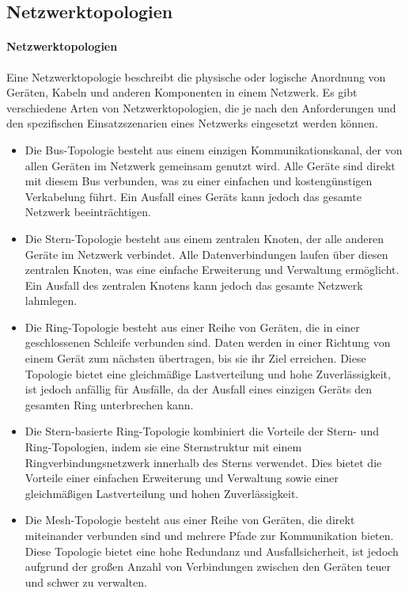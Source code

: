 \subsection{Netzwerktopologien}

\paragraph{Netzwerktopologien}

Eine Netzwerktopologie beschreibt die physische oder logische Anordnung von Geräten, Kabeln und anderen Komponenten in einem Netzwerk. Es gibt verschiedene Arten von Netzwerktopologien, die je nach den Anforderungen und den spezifischen Einsatzszenarien eines Netzwerks eingesetzt werden können.

\begin{itemize}
	\item Die Bus-Topologie besteht aus einem einzigen Kommunikationskanal, der von allen Geräten im Netzwerk gemeinsam genutzt wird. Alle Geräte sind direkt mit diesem Bus verbunden, was zu einer einfachen und kostengünstigen Verkabelung führt. Ein Ausfall eines Geräts kann jedoch das gesamte Netzwerk beeinträchtigen.
	\item Die Stern-Topologie besteht aus einem zentralen Knoten, der alle anderen Geräte im Netzwerk verbindet. Alle Datenverbindungen laufen über diesen zentralen Knoten, was eine einfache Erweiterung und Verwaltung ermöglicht. Ein Ausfall des zentralen Knotens kann jedoch das gesamte Netzwerk lahmlegen.
	\item Die Ring-Topologie besteht aus einer Reihe von Geräten, die in einer geschlossenen Schleife verbunden sind. Daten werden in einer Richtung von einem Gerät zum nächsten übertragen, bis sie ihr Ziel erreichen. Diese Topologie bietet eine gleichmäßige Lastverteilung und hohe Zuverlässigkeit, ist jedoch anfällig für Ausfälle, da der Ausfall eines einzigen Geräts den gesamten Ring unterbrechen kann.
	\item Die Stern-basierte Ring-Topologie kombiniert die Vorteile der Stern- und Ring-Topologien, indem sie eine Sternstruktur mit einem Ringverbindungsnetzwerk innerhalb des Sterns verwendet. Dies bietet die Vorteile einer einfachen Erweiterung und Verwaltung sowie einer gleichmäßigen Lastverteilung und hohen Zuverlässigkeit.
	\item Die Mesh-Topologie besteht aus einer Reihe von Geräten, die direkt miteinander verbunden sind und mehrere Pfade zur Kommunikation bieten. Diese Topologie bietet eine hohe Redundanz und Ausfallsicherheit, ist jedoch aufgrund der großen Anzahl von Verbindungen zwischen den Geräten teuer und schwer zu verwalten.
\end{itemize}

